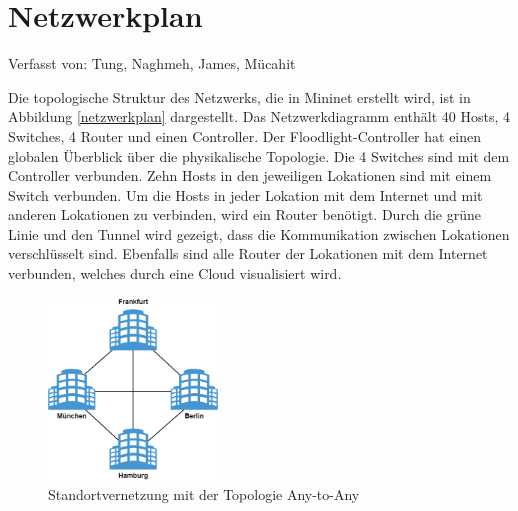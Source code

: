 \documentclass[fontsize=12pt,paper=a4,open=any,parskip=half,
  twoside=false,toc=listof,toc=bibliography,fleqn,leqno,
  captions=nooneline,captions=tableabove,british]{scrbook}
\begin{document}
\section{Netzwerkplan}
{\tiny Verfasst von: Tung, Naghmeh, James, Mücahit\par}
Die topologische Struktur des Netzwerks, die in Mininet erstellt wird, ist in Abbildung \ref{netzwerkplan} dargestellt. Das Netzwerkdiagramm enthält 40 Hosts, 4 Switches, 4 Router und einen Controller. Der Floodlight-Controller hat einen globalen Überblick über die physikalische Topologie. Die 4 Switches sind mit dem Controller verbunden. Zehn Hosts in den jeweiligen Lokationen sind mit einem Switch verbunden. Um die Hosts in jeder Lokation mit dem Internet und mit anderen Lokationen zu verbinden, wird ein Router benötigt. Durch die grüne Linie und den Tunnel wird gezeigt, dass die Kommunikation zwischen Lokationen verschlüsselt sind. Ebenfalls sind alle Router der Lokationen mit dem Internet verbunden, welches durch eine Cloud visualisiert wird.

\begin{figure}[H]
	\centering
	\includegraphics[width=0.4\textwidth]{Bilder/any-to-any}
	\captionsetup{justification=centering,margin=1cm}
	\caption{Standortvernetzung mit der Topologie Any-to-Any}
	\label{any-to-any}
\end{figure}
\end{document}
